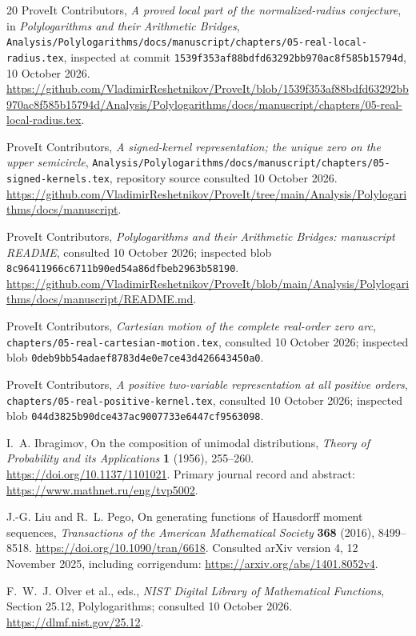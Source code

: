 \documentclass[11pt]{article}
\numberwithin{equation}{section}
\theoremstyle{definition}
\theoremstyle{remark}
\newcommand{\src}[1]{\nolinkurl{#1}}
\newcommand{\repocommit}{\texttt{1539f353af88bdfd63292bb970ac8f585b15794d}}
\begin{document}
\clearpage
\begin{thebibliography}{20}
ProveIt Contributors, \emph{A proved local part of the normalized-radius
conjecture}, in \emph{Polylogarithms and their Arithmetic Bridges},
\src{Analysis/Polylogarithms/docs/manuscript/chapters/05-real-local-radius.tex},
inspected at commit \repocommit, 10 October 2026.
\url{https://github.com/VladimirReshetnikov/ProveIt/blob/1539f353af88bdfd63292bb970ac8f585b15794d/Analysis/Polylogarithms/docs/manuscript/chapters/05-real-local-radius.tex}.

ProveIt Contributors, \emph{A signed-kernel representation; the unique zero
on the upper semicircle},
\src{Analysis/Polylogarithms/docs/manuscript/chapters/05-signed-kernels.tex},
repository source consulted 10 October 2026.
\url{https://github.com/VladimirReshetnikov/ProveIt/tree/main/Analysis/Polylogarithms/docs/manuscript}.

ProveIt Contributors, \emph{Polylogarithms and their Arithmetic Bridges:
manuscript README}, consulted 10 October 2026; inspected blob
\src{8c96411966c6711b90ed54a86dfbeb2963b58190}.
\url{https://github.com/VladimirReshetnikov/ProveIt/blob/main/Analysis/Polylogarithms/docs/manuscript/README.md}.

ProveIt Contributors, \emph{Cartesian motion of the complete real-order
zero arc}, \src{chapters/05-real-cartesian-motion.tex}, consulted
10 October 2026; inspected blob
\src{0deb9bb54adaef8783d4e0e7ce43d426643450a0}.

ProveIt Contributors, \emph{A positive two-variable representation at all
positive orders}, \src{chapters/05-real-positive-kernel.tex}, consulted
10 October 2026; inspected blob
\src{044d3825b90dce437ac9007733e6447cf9563098}.

I.~A. Ibragimov, On the composition of unimodal distributions,
\emph{Theory of Probability and its Applications} \textbf{1} (1956),
255--260. \url{https://doi.org/10.1137/1101021}.
Primary journal record and abstract:
\url{https://www.mathnet.ru/eng/tvp5002}.

J.-G. Liu and R.~L. Pego, On generating functions of Hausdorff moment
sequences, \emph{Transactions of the American Mathematical Society}
\textbf{368} (2016), 8499--8518.
\url{https://doi.org/10.1090/tran/6618}.
Consulted arXiv version 4, 12 November 2025, including corrigendum:
\url{https://arxiv.org/abs/1401.8052v4}.

F.~W.~J. Olver et al., eds., \emph{NIST Digital Library of Mathematical
Functions}, Section 25.12, Polylogarithms; consulted 10 October 2026.
\url{https://dlmf.nist.gov/25.12}.
\end{thebibliography}
\end{document}
